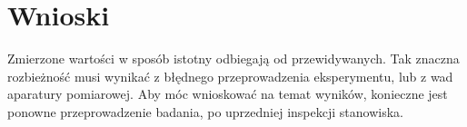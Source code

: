 \documentclass[12pt]{article}
\begin{document}
\section*{Wnioski}
Zmierzone wartości w sposób istotny odbiegają od przewidywanych. Tak znaczna rozbieżność musi wynikać z błędnego przeprowadzenia eksperymentu, lub z wad aparatury pomiarowej. Aby móc wnioskować na temat wyników, konieczne jest ponowne przeprowadzenie badania, po uprzedniej inspekcji stanowiska.
\end{document}
